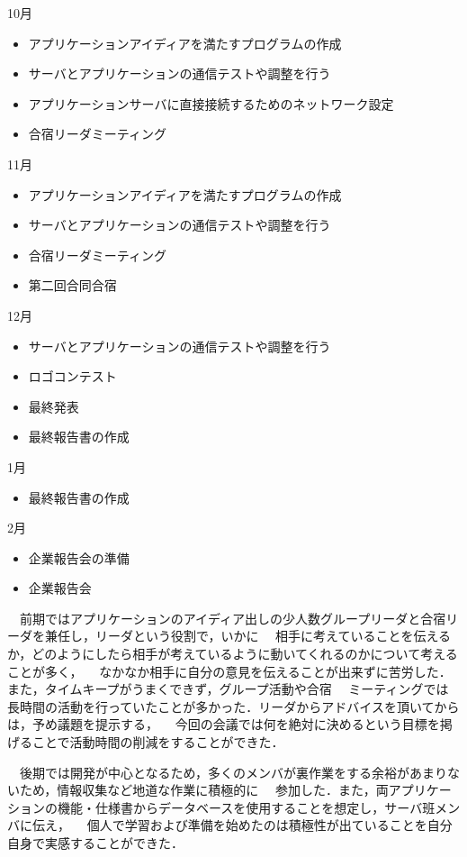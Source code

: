 10月
\begin{itemize}
\item アプリケーションアイディアを満たすプログラムの作成
\item サーバとアプリケーションの通信テストや調整を行う
\item アプリケーションサーバに直接接続するためのネットワーク設定
\item 合宿リーダミーティング
\end{itemize}
11月
\begin{itemize}
\item アプリケーションアイディアを満たすプログラムの作成
\item サーバとアプリケーションの通信テストや調整を行う
\item 合宿リーダミーティング
\item 第二回合同合宿
\end{itemize}
12月
\begin{itemize}
\item サーバとアプリケーションの通信テストや調整を行う
\item ロゴコンテスト
\item 最終発表
\item 最終報告書の作成
\end{itemize}
1月
\begin{itemize}
\item 最終報告書の作成
\end{itemize}
2月
\begin{itemize}
\item 企業報告会の準備
\item 企業報告会
\end{itemize}

\par
　前期ではアプリケーションのアイディア出しの少人数グループリーダと合宿リーダを兼任し，リーダという役割で，いかに
　相手に考えていることを伝えるか，どのようにしたら相手が考えているように動いてくれるのかについて考えることが多く，
　なかなか相手に自分の意見を伝えることが出来ずに苦労した．また，タイムキープがうまくできず，グループ活動や合宿
　ミーティングでは長時間の活動を行っていたことが多かった．リーダからアドバイスを頂いてからは，予め議題を提示する，
　今回の会議では何を絶対に決めるという目標を掲げることで活動時間の削減をすることができた．
\par
　後期では開発が中心となるため，多くのメンバが裏作業をする余裕があまりないため，情報収集など地道な作業に積極的に
　参加した．また，両アプリケーションの機能・仕様書からデータベースを使用することを想定し，サーバ班メンバに伝え，
　個人で学習および準備を始めたのは積極性が出ていることを自分自身で実感することができた．

